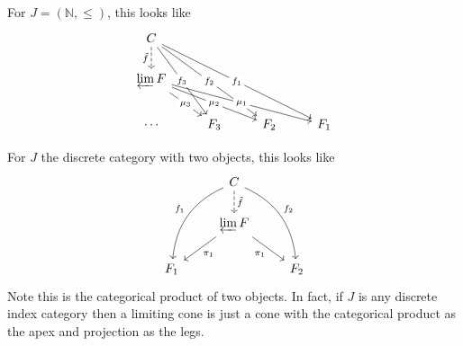\documentclass[12pt]{article}
\begin{document}
\begin{example}
	For $J=(\mathbb{N}, \leq)$, this looks like 
	\begin{equation*}
\begin{tikzcd}
C \arrow[rdd, "f_3" description] \arrow[rrdd, "f_2" description] \arrow[rrrdd, "f_1" description] \arrow[d, "\tilde{f}"', dashed] &     &     &     \\
\varprojlim F \arrow[rd, "\mu_3" description] \arrow[rrd, "\mu_2" description] \arrow[rrrd, "\mu_1" description]                  &     &     &     \\
\cdots                                                                                                                            & F_3 & F_2 & F_1
\end{tikzcd}
	\end{equation*}
\end{example}

\begin{example}
	For $J$ the discrete category with two objects, this looks like 
	\begin{equation*}
\begin{tikzcd}
    & C \arrow[ldd, "f_1"', bend right] \arrow[rdd, "f_2", bend left] \arrow[d, "\tilde{f}", dashed] &     \\
    & \varprojlim F \arrow[ld, "\pi_1"] \arrow[rd, "\pi_1"']                                         &     \\
F_1 &                                                                                                & F_2
\end{tikzcd}
	\end{equation*}
	Note this is the categorical product of two objects. In fact, if $J$ is any discrete index category then a limiting cone is just a cone with the categorical product as the apex and projection as the legs.
\end{example}
\end{document}
